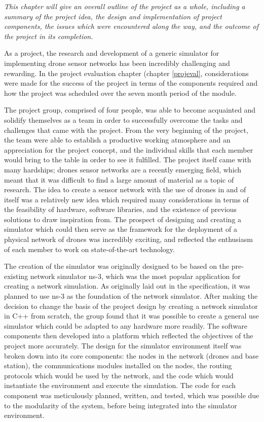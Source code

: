 \emph{This chapter will give an overall outline of the project as a whole, including a summary of the project idea, the design and implementation of project components, the issues which were encountered along the way, and the outcome of the project in its completion.}

As a project, the research and development of a generic simulator for implementing drone sensor networks has been incredibly challenging and rewarding. In the project evaluation chapter (chapter \ref{projeval}, considerations were made for the success of the project in terms of the components required and how the project was scheduled over the seven month period of the module. 

The project group, comprised of four people, was able to become acquainted and solidify themselves as a team in order to successfully overcome the tasks and challenges that came with the project. From the very beginning of the project, the team were able to establish a productive working atmosphere and an appreciation for the project concept, and the individual skills that each member would bring to the table in order to see it fulfilled. The project itself came with many hardships; drones sensor networks are a recently emerging field, which meant that it was difficult to find a large amount of material as a topic of research. The idea to create a sensor network with the use of drones in and of itself was a relatively new idea which required many considerations in terms of the feasibility of hardware, software libraries, and the existence of previous solutions to draw inspiration from. The prospect of designing and creating a simulator which could then serve as the framework for the deployment of a physical network of drones was incredibly exciting, and reflected the enthusiasm of each member to work on state-of-the-art technology. 

The creation of the simulator was originally designed to be based on the pre-existing network simulator ns-3, which was the most popular application for creating a network simulation. As originally laid out in the specification, it was planned to use ns-3 as the foundation of the network simulator. After making the decision to change the basis of the project design by creating a network simulator in C++ from scratch, the group found that it was possible to create a general use simulator which could be adapted to any hardware more readily. The software components then developed into a platform which reflected the objectives of the project more accurately. The design for the simulator environment itself was broken down into its core components: the nodes in the network (drones and base station), the communications modules installed on the nodes, the routing protocols which would be used by the network, and the code which would instantiate the environment and execute the simulation. The code for each component was meticulously planned, written, and tested, which was possible due to the modularity of the system, before being integrated into the simulator environment. 

